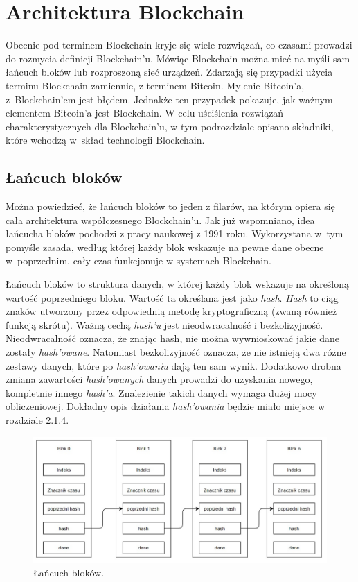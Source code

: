 \documentclass[a4paper,12pt]{book}
\begin{document}
\section{Architektura Blockchain}

Obecnie pod terminem Blockchain kryje się wiele rozwiązań, co czasami prowadzi do rozmycia definicji Blockchain'u. Mówiąc Blockchain można mieć na myśli sam łańcuch bloków lub rozproszoną sieć urządzeń. Zdarzają się przypadki użycia terminu Blockchain zamiennie, z terminem Bitcoin\cite{bitcoin-vs-blockchain}. Mylenie Bitcoin'a, z~Blockchain'em jest błędem. Jednakże ten przypadek pokazuje, jak ważnym elementem Bitcoin'a jest Blockchain. W celu uściślenia rozwiązań charakterystycznych dla Blockchain'u, w tym podrozdziale opisano składniki, które wchodzą w~skład technologii Blockchain.

\subsection{Łańcuch bloków}

Można powiedzieć, że łańcuch bloków to jeden z filarów, na którym opiera się cała architektura współczesnego Blockchain'u. Jak już wspomniano, idea łańcucha bloków pochodzi z pracy naukowej z 1991 roku. Wykorzystana w~tym pomyśle zasada, według której każdy blok wskazuje na pewne dane obecne w~poprzednim, cały czas funkcjonuje w systemach Blockchain.

Łańcuch bloków to struktura danych, w której każdy blok wskazuje na określoną wartość poprzedniego bloku. Wartość ta określana jest jako \textit{hash}. \textit{Hash} to ciąg znaków utworzony przez odpowiednią metodę kryptograficzną (zwaną również funkcją skrótu). Ważną cechą \textit{hash'u} jest nieodwracalność i bezkolizyjność. Nieodwracalność oznacza, że znając hash, nie można wywnioskować jakie dane zostały \textit{hash'owane}. Natomiast bezkolizyjność oznacza, że nie istnieją dwa różne zestawy danych, które po \textit{hash'owaniu} dają ten sam wynik. Dodatkowo drobna zmiana zawartości \textit{hash'owanych} danych prowadzi do uzyskania nowego, kompletnie innego \textit{hash'a}. Znalezienie takich danych wymaga dużej mocy obliczeniowej\cite{hash}. Dokładny opis działania \textit{hash'owania} będzie miało miejsce w rozdziale 2.1.4.

\begin{figure}[h]
	\centering
	\includegraphics[width=\textwidth]{images/łańcuch_bloków.jpg}
	\caption {Łańcuch bloków.}\label{blocksschain}
\end {figure}
\end{document}
